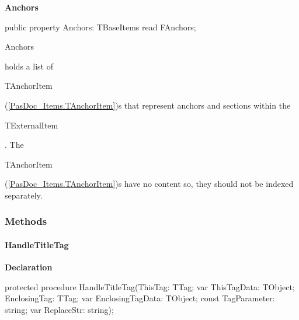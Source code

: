 \documentclass{report}
\newif\ifpdf
\begin{document}
\begin{list}{}
\par  \label{PasDoc_Items.TExternalItem-Anchors}
\item[\textbf{Anchors}\hfill]
\ifpdf
\begin{flushleft}
\fi
\begin{ttfamily}
public property Anchors: TBaseItems read FAnchors;\end{ttfamily}

\ifpdf
\end{flushleft}
\fi


\par \begin{ttfamily}Anchors\end{ttfamily} holds a list of \begin{ttfamily}TAnchorItem\end{ttfamily}(\ref{PasDoc_Items.TAnchorItem})s that represent anchors and sections within the \begin{ttfamily}TExternalItem\end{ttfamily}. The \begin{ttfamily}TAnchorItem\end{ttfamily}(\ref{PasDoc_Items.TAnchorItem})s have no content so, they should not be indexed separately.\end{list}
\subsubsection*{\large{\textbf{Methods}}\normalsize\hspace{1ex}\hfill}
\paragraph*{HandleTitleTag}\hspace*{\fill}

\label{PasDoc_Items.TExternalItem-HandleTitleTag}
\begin{list}{}{
\setlength{\itemindent}{0cm}
\setlength{\listparindent}{0cm}
\setlength{\leftmargin}{\evensidemargin}
\addtolength{\leftmargin}{\tmplength}
\settowidth{\labelsep}{X}
\addtolength{\leftmargin}{\labelsep}
\setlength{\labelwidth}{\tmplength}
}
\item[\textbf{Declaration}\hfill]
\ifpdf
\begin{flushleft}
\fi
\begin{ttfamily}
protected procedure HandleTitleTag(ThisTag: TTag; var ThisTagData: TObject; EnclosingTag: TTag; var EnclosingTagData: TObject; const TagParameter: string; var ReplaceStr: string);\end{ttfamily}

\ifpdf
\end{flushleft}
\fi

\end{list}
\end{document}
